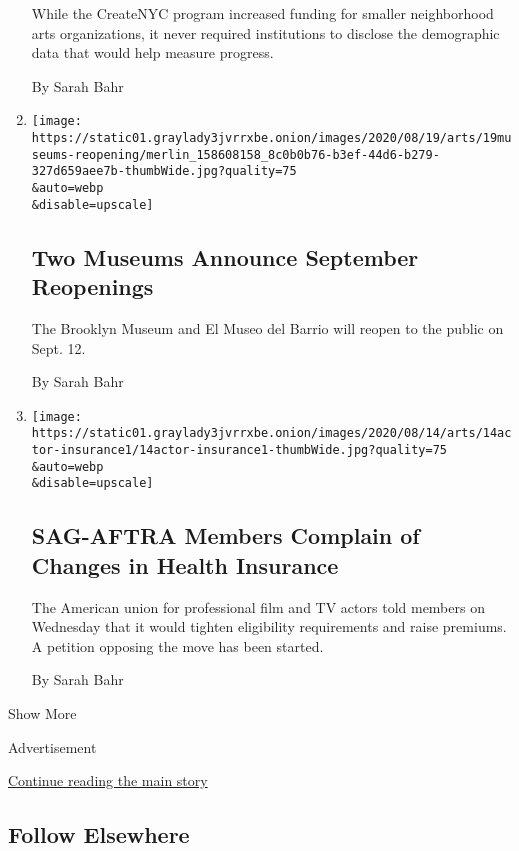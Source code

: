 \begin{enumerate}
  While the CreateNYC program increased funding for smaller neighborhood
  arts organizations, it never required institutions to disclose the
  demographic data that would help measure progress.

  By Sarah Bahr
\item
  \href{/2020/08/19/arts/design/brooklyn-museum-el-museo-del-barrio-reopening.html}{}

  \texttt{[image: https://static01.graylady3jvrrxbe.onion/images/2020/08/19/arts/19museums-reopening/merlin\_158608158\_8c0b0b76-b3ef-44d6-b279-327d659aee7b-thumbWide.jpg?quality=75\\\&auto=webp\\\&disable=upscale]}

  \hypertarget{two-museums-announce-september-reopenings}{%
  \subsection{Two Museums Announce September
  Reopenings}\label{two-museums-announce-september-reopenings}}

  The Brooklyn Museum and El Museo del Barrio will reopen to the public
  on Sept. 12.

  By Sarah Bahr
\item
  \href{/2020/08/14/arts/television/sag-actors-health-insurance.html}{}

  \texttt{[image: https://static01.graylady3jvrrxbe.onion/images/2020/08/14/arts/14actor-insurance1/14actor-insurance1-thumbWide.jpg?quality=75\\\&auto=webp\\\&disable=upscale]}

  \hypertarget{sag-aftra-members-complain-of-changes-in-health-insurance}{%
  \subsection{SAG-AFTRA Members Complain of Changes in Health
  Insurance}\label{sag-aftra-members-complain-of-changes-in-health-insurance}}

  The American union for professional film and TV actors told members on
  Wednesday that it would tighten eligibility requirements and raise
  premiums. A petition opposing the move has been started.

  By Sarah Bahr
\end{enumerate}

Show More

Advertisement

\protect\hyperlink{after-mid2}{Continue reading the main story}

\hypertarget{follow-elsewhere}{%
\subsection{Follow Elsewhere}\label{follow-elsewhere}}

